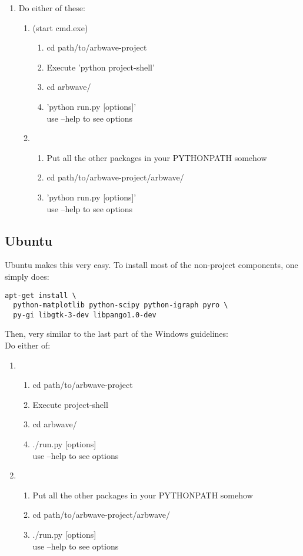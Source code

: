\begin{enumerate}
  \item Do either of these:
    \begin{enumerate}
      \item  (start cmd.exe)
        \begin{enumerate}
          \item cd path/to/arbwave-project
          \item Execute 'python project-shell'
          \item cd arbwave/
          \item 'python run.py [options]'\\
            use --help to see options
        \end{enumerate}
      \item
        \begin{enumerate}
          \item Put all the other packages in your PYTHONPATH somehow
          \item cd path/to/arbwave-project/arbwave/
          \item 'python run.py [options]'\\
            use --help to see options
        \end{enumerate}
    \end{enumerate}
\end{enumerate}



\subsection{Ubuntu}
Ubuntu makes this very easy.  To install most of the non-project components, one
simply does:

\begin{verbatim}
apt-get install \
  python-matplotlib python-scipy python-igraph pyro \
  py-gi libgtk-3-dev libpango1.0-dev
\end{verbatim}


Then, very similar to the last part of the Windows guidelines: \\
Do either of:
\begin{enumerate}
  \item
    \begin{enumerate}
      \item cd path/to/arbwave-project
      \item Execute project-shell
      \item cd arbwave/
      \item ./run.py [options]\\
        use --help to see options
    \end{enumerate}
  \item
    \begin{enumerate}
      \item Put all the other packages in your PYTHONPATH somehow
      \item cd path/to/arbwave-project/arbwave/
      \item ./run.py [options]\\
        use --help to see options
    \end{enumerate}
\end{enumerate}
